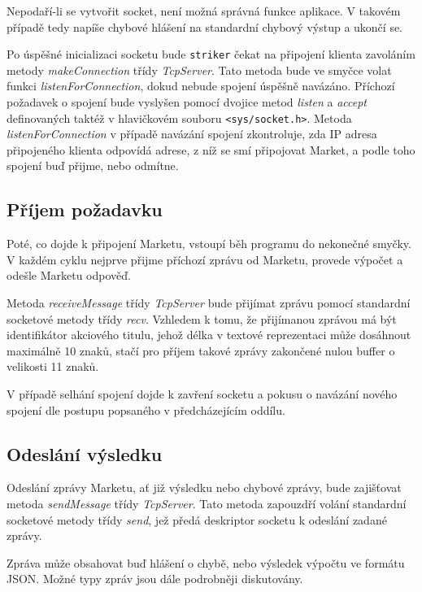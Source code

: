 \documentclass[thesis=M,czech]{FITthesis}[2012/06/26]
\begin{document}
Nepodaří-li se vytvořit socket, není možná správná funkce aplikace. V takovém případě tedy napíše chybové hlášení na 
standardní chybový výstup a ukončí se.

Po úspěšné inicializaci socketu bude \texttt{striker} čekat na připojení klienta zavoláním metody \textit{makeConnection} 
třídy \textit{TcpServer}. Tato metoda bude ve smyčce volat funkci \textit{listenForConnection}, dokud nebude spojení 
úspěšně navázáno. Příchozí požadavek o spojení bude vyslyšen pomocí dvojice metod \textit{listen} a \textit{accept} 
definovaných taktéž v hlavičkovém souboru \texttt{<sys/socket.h>}. Metoda \textit{listenForConnection} v případě 
navázání spojení zkontroluje, zda IP adresa připojeného klienta odpovídá adrese, z níž se smí připojovat Market, a 
podle toho spojení buď přijme, nebo odmítne.


\subsection{Příjem požadavku}

Poté, co dojde k připojení Marketu, vstoupí běh programu do nekonečné smyčky. V každém cyklu nejprve přijme
příchozí zprávu od Marketu, provede výpočet a odešle Marketu odpověď. 

Metoda \textit{receiveMessage} třídy \textit{TcpServer} bude přijímat zprávu pomocí standardní socketové metody 
třídy \textit{recv}. Vzhledem k tomu, že přijímanou zprávou má být identifikátor akciového titulu, jehož délka v textové 
reprezentaci může dosáhnout maximálně 10 znaků, stačí pro příjem takové zprávy zakončené nulou buffer o velikosti 11 znaků. 

V případě selhání spojení dojde k zavření socketu a pokusu o navázání nového spojení dle postupu popsaného v předcházejícím 
oddílu.


\subsection{Odeslání výsledku}

Odeslání zprávy Marketu, ať již výsledku nebo chybové zprávy, bude zajišťovat metoda \textit{sendMessage} třídy 
\textit{TcpServer}. Tato metoda zapouzdří volání standardní socketové metody třídy \textit{send}, jež předá deskriptor 
socketu k odeslání zadané zprávy.

Zpráva může obsahovat buď hlášení o chybě, nebo výsledek výpočtu ve formátu JSON. Možné typy zpráv jsou dále podrobněji 
diskutovány.
\end{document}
